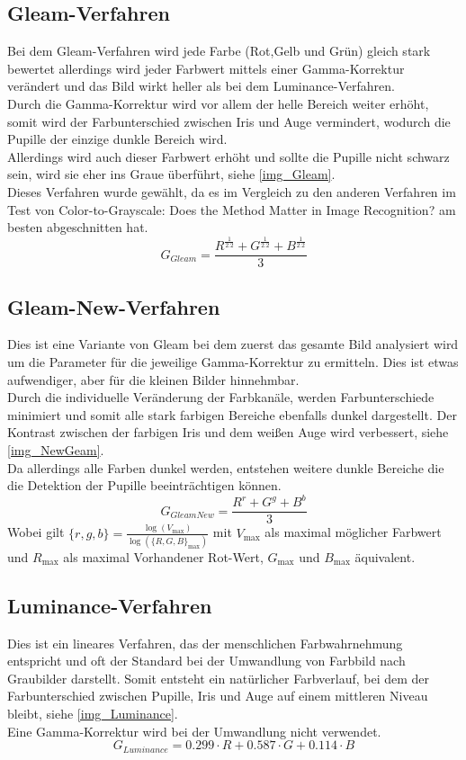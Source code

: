 \subsection{Gleam-Verfahren}
\label{gray_Gleam}
Bei dem Gleam-Verfahren wird jede Farbe (Rot,Gelb und Grün) gleich stark bewertet allerdings wird jeder Farbwert mittels einer Gamma-Korrektur verändert und das Bild wirkt heller als bei dem Luminance-Verfahren.\\
Durch die Gamma-Korrektur wird vor allem der helle Bereich weiter erhöht, somit wird der Farbunterschied zwischen Iris und Auge vermindert, wodurch die Pupille der einzige dunkle Bereich wird.\\
Allerdings wird auch dieser Farbwert erhöht und sollte die Pupille nicht schwarz sein, wird sie eher ins Graue überführt, siehe \autoref{img_Gleam}.\\
Dieses Verfahren wurde gewählt, da es im Vergleich zu den anderen Verfahren im Test von \glqq Color-to-Grayscale: Does the Method Matter in Image Recognition?\grqq \cite{rgb_to_Gray} am besten abgeschnitten hat.
\[G_{Gleam}=\dfrac{R^{\frac{1}{2.2}} + G^{\frac{1}{2.2}} + B^{\frac{1}{2.2}}}{3}\]
\subsection{Gleam-New-Verfahren}
\label{gray_New}
Dies ist eine Variante von Gleam bei dem zuerst das gesamte Bild analysiert wird um die Parameter für die jeweilige Gamma-Korrektur zu ermitteln. Dies ist etwas aufwendiger, aber für die kleinen Bilder hinnehmbar.\\
Durch die individuelle Veränderung der Farbkanäle, werden Farbunterschiede minimiert und somit alle stark farbigen Bereiche ebenfalls dunkel dargestellt. Der Kontrast zwischen der farbigen Iris und dem weißen Auge wird verbessert, siehe \autoref{img_NewGeam}.\\
Da allerdings alle Farben dunkel werden, entstehen weitere dunkle Bereiche die die Detektion der Pupille beeinträchtigen können.
\[G_{Gleam New}=\dfrac{R^{r} + G^{g} + B^{b}}{3}\]
Wobei gilt $\{r,g,b\} = \frac{\log(V_{\max})}{\log(\{R,G,B\}_{\max})}$ mit $V_{\max}$ als maximal möglicher Farbwert und $R_{\max}$ als maximal Vorhandener Rot-Wert, $G_{\max}$ und $B_{\max}$ äquivalent.
\subsection{Luminance-Verfahren}
\label{gray_Luminance}
Dies ist ein lineares Verfahren, das der menschlichen Farbwahrnehmung entspricht und  oft der Standard bei der Umwandlung von Farbbild nach Graubilder darstellt. Somit entsteht ein natürlicher Farbverlauf, bei dem der Farbunterschied zwischen Pupille, Iris und Auge auf einem mittleren Niveau bleibt, siehe \autoref{img_Luminance}.\\
Eine Gamma-Korrektur wird bei der Umwandlung nicht verwendet.
\[G_{Luminance} = 0.299 \cdot R + 0.587 \cdot G + 0.114 \cdot B\]
